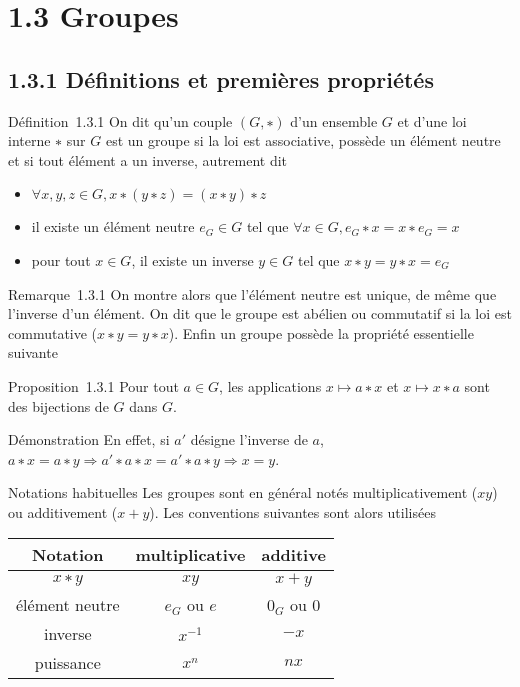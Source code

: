 \section{1.3 Groupes}

\subsection{1.3.1 Définitions et premières propriétés}

Définition~1.3.1 On dit qu'un couple $(G,∗)$ d'un ensemble $G$ et d'une loi
interne $∗$ sur $G$ est un groupe si la loi est associative, possède un
élément neutre et si tout élément a un inverse, autrement dit

\begin{itemize}
\itemsep1pt\parskip0pt
\item
  $\forall x,y,z \in G, x ∗ (y ∗ z) = (x ∗ y) ∗ z$
\item
  il existe un élément neutre $e_G \in G$ tel que
  $\forall x \in G, e_G ∗ x = x ∗ e_G = x$
\item
  pour tout $x \in G$, il existe un inverse $y \in G$ tel que $x ∗ y = y ∗ x = e_G$
\end{itemize}

Remarque~1.3.1 On montre alors que l'élément neutre est unique, de même
que l'inverse d'un élément. On dit que le groupe est abélien ou
commutatif si la loi est commutative ($x ∗ y = y ∗ x$). Enfin un groupe
possède la propriété essentielle suivante

Proposition~1.3.1 Pour tout $a \in G$, les applications
$x \mapsto a ∗ x$ et $x \mapsto x ∗ a$
sont des bijections de $G$ dans $G$.

Démonstration En effet, si $a'$ désigne l'inverse de $a$, $a ∗ x = a ∗ y \Rightarrow a' ∗ a ∗ x = a' ∗ a ∗ y \Rightarrow x = y$.

Notations habituelles Les groupes sont en général notés
multiplicativement ($xy$) ou additivement ($x + y$). Les conventions
suivantes sont alors utilisées

\begin{center}
\begin{tabular}{|c|c|c|}
\hline
Notation & multiplicative & additive \\
\hline
$x ∗ y$ & $xy$ & $x + y$ \\
élément neutre & $e_G$ ou $e$ & $0_G$ ou $0$ \\
inverse & $x^{-1}$ & $-x$ \\
puissance & $x^n$ & $nx$ \\
\hline
\end{tabular}
\end{center}

